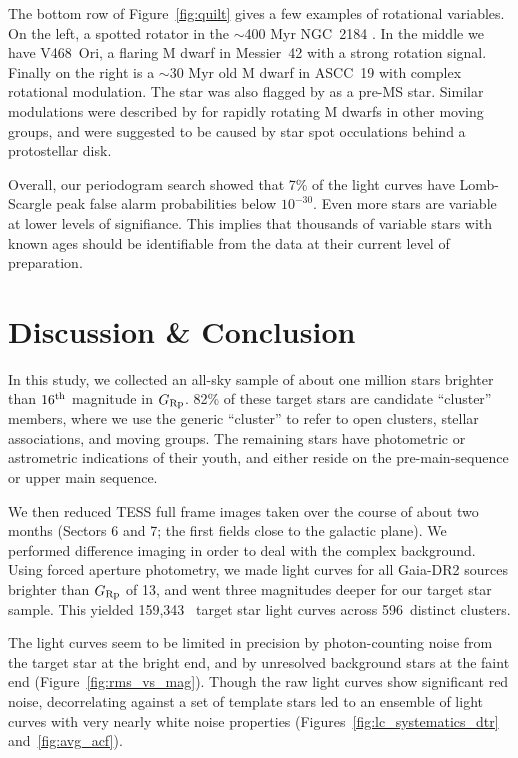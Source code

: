 \documentclass[12pt,twocolumn,tighten]{aastex62}
\newcommand{\numberlcs}{159{,}343\ } %
\newcommand{\numberclusters}{596\ } %
\begin{document}
The bottom row of Figure~\ref{fig:quilt} gives a few examples of
rotational variables.  On the left, a spotted rotator in the
$\sim$400 Myr NGC~2184 \citep{cantat-gaudin_gaia_2018}.  In the
middle we have V468~Ori, a flaring M dwarf in Messier~42 with a strong
rotation signal.
Finally on the right is a $\sim$30 Myr old M dwarf in ASCC~19
with complex rotational modulation.
The star was also flagged by \citet{zari_3d_2018} as a pre-MS star.
Similar modulations were described by \citet{zhan_complex_2019} for
rapidly rotating M dwarfs in other moving groups, and were suggested
to be caused by star spot occulations behind a protostellar disk.

Overall, our periodogram search showed that 7\% of the light curves
have Lomb-Scargle peak false alarm probabilities below $10^{-30}$.
Even more stars are variable at lower levels of signifiance.  This implies
that thousands of variable stars with known ages should
be identifiable from the data at their current level of preparation.




\section{Discussion \& Conclusion}
\label{sec:conclusion}

In this study, we collected an all-sky sample of about one million
stars brighter than $16^{\rm th}$ magnitude in $G_{\rm Rp}$.
82\% of these target stars
are candidate ``cluster'' members, where we use the generic
``cluster'' to refer to open clusters, stellar associations, and
moving groups.  The remaining stars have photometric or astrometric
indications of their youth, and either reside on the pre-main-sequence
or upper main sequence.

We then reduced TESS full frame images taken over the course of about
two months (Sectors 6 and 7; the first fields close to the galactic
plane).  We performed difference imaging in order to deal with the
complex background.  Using forced aperture photometry, we made light
curves for all Gaia-DR2 sources brighter than $G_{\rm Rp}$ of 13, and went three
magnitudes deeper for our target star sample.  This yielded \numberlcs
target star light curves across \numberclusters distinct
clusters.

The light curves seem to be limited in precision by photon-counting
noise from the target star at the bright end, and by unresolved
background stars at the faint end (Figure~\ref{fig:rms_vs_mag}).
Though the raw light curves show significant red noise, decorrelating
against a set of template stars led to an ensemble of light curves
with very nearly white noise properties
(Figures~\ref{fig:lc_systematics_dtr} and~\ref{fig:avg_acf}).
\end{document}

